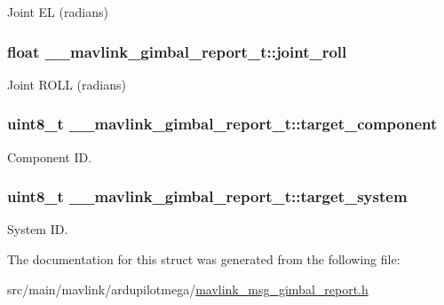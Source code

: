 Joint E\+L (radians) 

\hypertarget{struct____mavlink__gimbal__report__t_a5e1ca7e83ccedc11cb9c0d0f4c8aff7a}{
\subsubsection[{joint\+\_\+roll}]{\setlength{\rightskip}{0pt plus 5cm}float \+\_\+\+\_\+mavlink\+\_\+gimbal\+\_\+report\+\_\+t\+::joint\+\_\+roll}}\label{struct____mavlink__gimbal__report__t_a5e1ca7e83ccedc11cb9c0d0f4c8aff7a}


Joint R\+O\+L\+L (radians) 

\hypertarget{struct____mavlink__gimbal__report__t_a8429086f0e8457633c4cbbe7ffd61f33}{
\subsubsection[{target\+\_\+component}]{\setlength{\rightskip}{0pt plus 5cm}uint8\+\_\+t \+\_\+\+\_\+mavlink\+\_\+gimbal\+\_\+report\+\_\+t\+::target\+\_\+component}}\label{struct____mavlink__gimbal__report__t_a8429086f0e8457633c4cbbe7ffd61f33}


Component I\+D. 

\hypertarget{struct____mavlink__gimbal__report__t_a4e27e7a39534606377aa93a904197d82}{
\subsubsection[{target\+\_\+system}]{\setlength{\rightskip}{0pt plus 5cm}uint8\+\_\+t \+\_\+\+\_\+mavlink\+\_\+gimbal\+\_\+report\+\_\+t\+::target\+\_\+system}}\label{struct____mavlink__gimbal__report__t_a4e27e7a39534606377aa93a904197d82}


System I\+D. 



The documentation for this struct was generated from the following file\+:\begin{DoxyCompactItemize}
\item 
src/main/mavlink/ardupilotmega/\hyperlink{mavlink__msg__gimbal__report_8h}{mavlink\+\_\+msg\+\_\+gimbal\+\_\+report.\+h}\end{DoxyCompactItemize}
